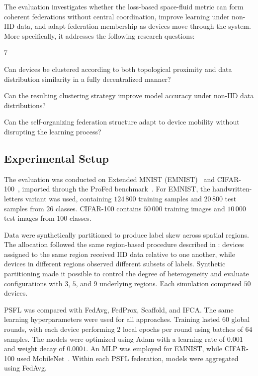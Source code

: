 The evaluation investigates whether the loss-based space-fluid metric can form
coherent federations without central coordination, improve learning under
non-\gls{IID} data, and adapt federation membership as devices move through the
system.
%
More specifically, it addresses the following research questions:

\begin{chapRQ}{7}
  \item
  Can devices be clustered according to both topological proximity and data
  distribution similarity in a fully decentralized manner?
  \label{rq:psfl-clustering}

  \item
  Can the resulting clustering strategy improve model accuracy under
  non-\gls{IID} data distributions?
  \label{rq:psfl-accuracy}

  \item
  Can the self-organizing federation structure adapt to device mobility without
  disrupting the learning process?
  \label{rq:psfl-mobility}
\end{chapRQ}


\subsection{Experimental Setup}
\label{sec:psfl-experimental-setup}

The evaluation was conducted on Extended MNIST
(EMNIST)~\cite{DBLP:journals/corr/CohenATS17} and
CIFAR-100~\cite{krizhevsky2009learning}, imported through the ProFed
benchmark~\cite{DBLP:journals/jors/DominiIALV26}.
%
For EMNIST, the handwritten-letters variant was used, containing \(124\,800\)
training samples and \(20\,800\) test samples from \(26\) classes.
%
CIFAR-100 contains \(50\,000\) training images and \(10\,000\) test images from
\(100\) classes.

Data were synthetically partitioned to produce label skew across spatial
regions.
%
The allocation followed the same region-based procedure described in
: devices assigned to the same region received
\gls{IID} data relative to one another, while devices in different regions
observed different subsets of labels.
%
Synthetic partitioning made it possible to control the degree of heterogeneity
and evaluate configurations with \(3\), \(5\), and \(9\) underlying regions.
%
Each simulation comprised \(50\) devices.

\gls{PSFL} was compared with \gls{FedAvg}, FedProx, Scaffold, and IFCA.
%
The same learning hyperparameters were used for all approaches.
%
Training lasted \(60\) global rounds, with each device performing \(2\) local
epochs per round using batches of \(64\) samples.
%
The models were optimized using Adam with a learning rate of \(0.001\) and
weight decay of \(0.0001\).
%
An MLP was employed for EMNIST, while CIFAR-100 used
MobileNet~\cite{DBLP:conf/cvpr/SandlerHZZC18}.
%
Within each \gls{PSFL} federation, models were aggregated using
\gls{FedAvg}.

